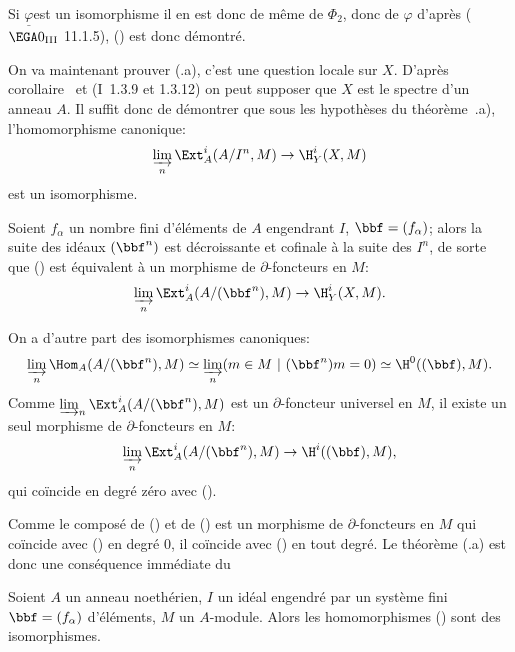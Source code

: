 Si $\underline{\varphi}$\pageoriginale est un isomorphisme il en est donc de m\^eme de $\Phi_2$, donc de $\varphi$ d'apr\`es ($\EGA 0_{\textup{III}}$ 11.1.5), () est donc d\'emontr\'e.

On va maintenant prouver (.a), c'est une question locale sur $X$. D'apr\`es \ignorespaces corollaire~ et (\EGA I~1.3.9 et 1.3.12) on peut supposer que $X$ est le spectre d'un anneau $A$. Il suffit donc de d\'emontrer que sous les hypoth\`eses du th\'eor\`eme~.a), l'homomorphisme canonique:
\begin{equation} \label{eq:II.7.3} \varinjlim_{n} \Ext_A^i(A/I^n, M) \to \H_Y^i(X, M)
\end{equation}
est un isomorphisme.

Soient $f_{\alpha}$ un nombre fini d'\'el\'ements de $A$ engendrant $I$, $\bbf=(f_{\alpha})$; alors la suite des id\'eaux $(\bbf^n)$ est d\'ecroissante et cofinale \`a la suite des $I^n$, de sorte que () est \'equivalent \`a un morphisme de $\partial$-foncteurs en $M$:
\begin{equation} \label{eq:II.7.4} \varinjlim_{n} \Ext_A^i(A/(\bbf^n), M) \to \H_Y^i(X, M).
\end{equation}

On a d'autre part des isomorphismes canoniques:
\begin{equation} \label{eq:II.7.5} \varinjlim_{n} \Hom_A(A/(\bbf^n), M) \simeq \varinjlim_{n} (m\in M\ |\ (\bbf^n)m=0) \simeq \H^0((\bbf), M).
\end{equation}
Comme $\varinjlim_{n} \Ext_A^i(A/(\bbf^n), M)$ est un $\partial$-foncteur universel en $M$, il existe un seul morphisme de $\partial$-foncteurs en $M$:
\begin{equation} \label{eq:II.7.6} \varinjlim_{n} \Ext_A^i(A/(\bbf^n), M) \to \H^i((\bbf), M),
\end{equation}
qui co\"incide en degr\'e z\'ero avec ().

Comme le compos\'e de () et de () est un morphisme de $\partial$-foncteurs en $M$ qui co\"incide avec () en degr\'e $0$, il co\"incide avec () en tout degr\'e. Le th\'eor\`eme (.a) est donc une cons\'equence imm\'ediate du

\begin{suplemme} \label{II.8}
Soient $A$ un anneau noeth\'erien, $I$ un id\'eal engendr\'e par un syst\`eme fini $\bbf=(f_{\alpha})$ d'\'el\'ements, $M$ un $A$-module. Alors les homomorphismes () sont des isomorphismes.
\end{suplemme}


